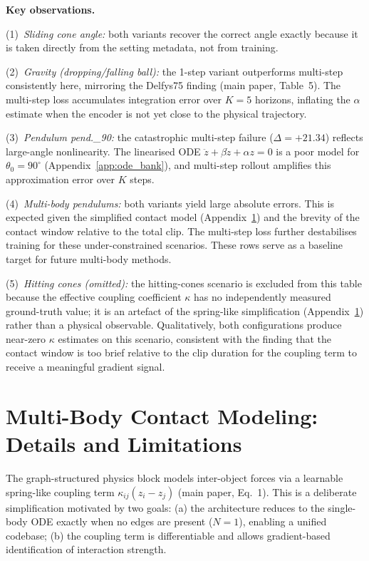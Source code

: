 \documentclass[runningheads]{llncs}
\begin{document}
\textbf{Key observations.}

\noindent(1)~\textit{Sliding cone angle:} both variants recover the correct
angle exactly because it is taken directly from the setting metadata,
not from training.

\noindent(2)~\textit{Gravity (dropping/falling ball):} the 1-step variant
outperforms multi-step consistently here, mirroring the Delfys75 finding
(main paper, Table~5).  The multi-step loss accumulates integration error
over $K{=}5$ horizons, inflating the $\alpha$ estimate when the encoder
is not yet close to the physical trajectory.

\noindent(3)~\textit{Pendulum pend.\_90:} the catastrophic multi-step
failure ($\Delta = +21.34$) reflects large-angle nonlinearity.  The
linearised ODE $\ddot{z} + \beta\dot{z} + \alpha z = 0$ is a poor model
for $\theta_0 = 90^\circ$ (Appendix~\ref{app:ode_bank}), and multi-step
rollout amplifies this approximation error over $K$ steps.

\noindent(4)~\textit{Multi-body pendulums:} both variants yield large
absolute errors.  This is expected given the simplified contact model
(Appendix~\ref{app:multibody}) and the brevity of the contact window
relative to the total clip.  The multi-step loss further destabilises
training for these under-constrained scenarios.  These rows serve as
a baseline target for future multi-body methods.

\noindent(5)~\textit{Hitting cones (omitted):} the hitting-cones scenario
is excluded from this table because the effective coupling coefficient
$\kappa$ has no independently measured ground-truth value; it is an
artefact of the spring-like simplification (Appendix~\ref{app:multibody})
rather than a physical observable.  Qualitatively, both configurations
produce near-zero $\kappa$ estimates on this scenario, consistent with
the finding that the contact window is too brief relative to the clip
duration for the coupling term to receive a meaningful gradient signal.


\section{Multi-Body Contact Modeling: Details and Limitations}
\label{app:multibody}

The graph-structured physics block models inter-object forces via a
learnable spring-like coupling term $\kappa_{ij}(z_i - z_j)$
(main paper, Eq.~1).  This is a deliberate simplification motivated by two goals:
(a) the architecture reduces to the single-body ODE exactly when no edges
are present ($N = 1$), enabling a unified codebase; (b) the coupling term
is differentiable and allows gradient-based identification of interaction
strength.
\end{document}
